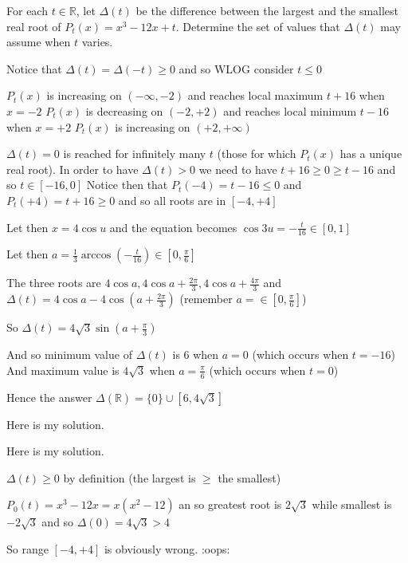 \begin{solution}
	\begin{tcolorbox}For each $t \in\mathbb{R}$, let $\Delta(t)$ be the difference between the largest and the smallest real root of $P_t(x)=x^3-12x+t$. Determine the set of values that $\Delta(t)$ may assume when $t$ varies.\end{tcolorbox}
Notice that $\Delta(t)=\Delta(-t)\ge 0$ and so WLOG consider $t\le 0$

$P_t(x)$ is increasing on $(-\infty,-2)$ and reaches local maximum $t+16$ when $x=-2$
$P_t(x)$ is decreasing on $(-2,+2)$ and reaches local minimum $t-16$ when $x=+2$
$P_t(x)$ is increasing on $(+2,+\infty)$ 

$\Delta(t)=0$ is reached for infinitely many $t$ (those for which $P_t(x)$ has a unique real root). 
In order to have $\Delta(t)>0$ we need to have $t+16\ge 0\ge t-16$ and so $t\in[-16,0]$
Notice then that $P_t(-4)=t-16\le 0$ and $P_t(+4)=t+16\ge 0$ and so all roots are in $[-4,+4]$

Let then $x=4\cos u$ and the equation becomes $\cos 3u=-\frac t{16}\in[0,1]$

Let then $a=\frac 13\arccos(-\frac t{16})\in[0,\frac{\pi}6]$

The three roots are $4\cos a,4\cos a+\frac{2\pi}3,4\cos a+\frac{4\pi}3$ and $\Delta(t)=4\cos a-4\cos(a+\frac{2\pi}3)$ (remember $a=\in[0,\frac{\pi}6]$)

So $\Delta(t)=4\sqrt 3\sin(a+\frac{\pi}3)$

And so minimum value of $\Delta(t)$ is $6$ when $a=0$ (which occurs when $t=-16$)
And maximum value is $4\sqrt 3$ when $a=\frac{\pi}6$ (which occurs when $t=0$)

Hence the answer $\boxed{\Delta(\mathbb R)=\{0\}\cup[6,4\sqrt 3]}$
\end{solution}



\begin{solution}
	Here is my solution.
\end{solution}



\begin{solution}
	\begin{tcolorbox}Here is my solution.\end{tcolorbox}
$\Delta(t)\ge 0$ by definition (the largest is $\ge$ the smallest)

$P_0(t)=x^3-12x=x(x^2-12)$ an so greatest root is $2\sqrt 3$ while smallest is $-2\sqrt 3$ and so $\Delta(0)=4\sqrt 3 > 4$

So range $[-4,+4]$ is obviously wrong. :oops:
\end{solution}



